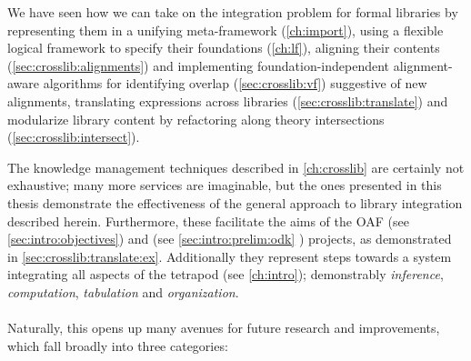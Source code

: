 We have seen how we can take on the integration problem for formal libraries by representing them in a unifying meta-framework (\autoref{ch:import}), using a flexible logical framework to specify their foundations (\autoref{ch:lf}), aligning their contents (\autoref{sec:crosslib:alignments}) and implementing foundation-independent alignment-aware algorithms for identifying overlap (\autoref{sec:crosslib:vf}) suggestive of new alignments, translating expressions across libraries (\autoref{sec:crosslib:translate}) and modularize library content by refactoring along theory intersections (\autoref{sec:crosslib:intersect}).

The knowledge management techniques described in \autoref{ch:crosslib} are certainly not exhaustive; many more services are imaginable, but the ones presented in this thesis demonstrate the effectiveness of the general approach to library integration described herein. Furthermore, these facilitate the aims of the OAF (see \autoref{sec:intro:objectives}) and \ODK (see \autoref{sec:intro:prelim:odk} ) projects, as demonstrated in \autoref{sec:crosslib:translate:ex}. Additionally they represent steps towards a system integrating all aspects of the tetrapod (see \autoref{ch:intro}); demonstrably \emph{inference}, \emph{computation}, \emph{tabulation} and \emph{organization}.

\paragraph{} Naturally, this opens up many avenues for future research and improvements, which fall broadly into three categories:

